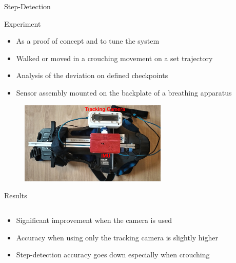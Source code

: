 \documentclass[aspectratio=169,handout]{beamer}
\begin{document}
{\begin{frame}{Step-Detection}
		
		
	\end{frame}
	
	\begin{frame}{Experiment}
		\begin{itemize}
			\item<2-> As a proof of concept and to tune the system
			\item<3-> Walked or moved in a crouching movement on a set trajectory
			\item<4-> Analysis of the deviation on defined checkpoints
			\item<5-> Sensor assembly mounted on the backplate of a breathing apparatus
		\end{itemize}
		\begin{figure}
			\centering
			\includegraphics[width=7cm]{../Conference_Paper/Assembly.jpg}
		\end{figure}
		
	\end{frame}
	
	
		\begin{frame}{Results}
		\begin{columns}
			\begin{column}{0.45\textwidth}
				\begin{itemize}
					\item<2-> Significant improvement when the camera is used
					\item<3-> Accuracy when using only the tracking camera is slightly higher %
					\item<4-> Step-detection accuracy goes down especially when crouching
				\end{itemize}
				

\end{column}
\end{columns}
\end{frame}}
\end{document}
